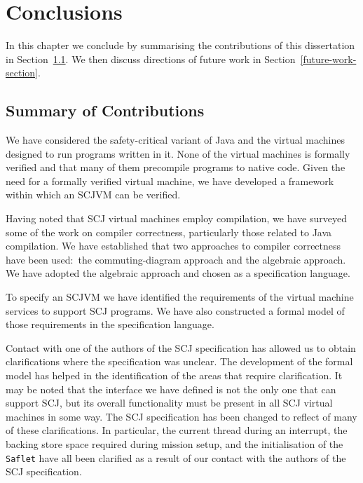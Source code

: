 \chapter{Conclusions}
\label{conclusions-chapter}
In this chapter we conclude by summarising the contributions of this
dissertation in Section~\ref{summary-section}.
We then discuss directions of future work in
Section~\ref{future-work-section}.

\section{Summary of Contributions}
\label{summary-section}

We have considered the safety-critical variant of Java and the virtual
machines designed to run programs written in it.
None of the virtual machines is formally verified and that many of
them precompile programs to native code.
Given the need for a formally verified virtual machine, we have
developed a framework within which an SCJVM can be verified.

Having noted that SCJ virtual machines employ compilation, we have
surveyed some of the work on compiler correctness, particularly those
related to Java compilation.
We have established that two approaches to compiler correctness have
been used:~the commuting-diagram approach and the algebraic approach.
We have adopted the algebraic approach and chosen \Circus{} as a
specification language.

To specify an SCJVM we have identified the requirements
of the virtual machine services to support SCJ programs.
We have also constructed a formal model of those requirements in the
\Circus{} specification language.

Contact with one of the authors of the SCJ specification has allowed
us to obtain clarifications where the specification was unclear.
The development of the formal model has helped in the identification
of the areas that require clarification.
It may be noted that the interface we have defined is not the only one
that can support SCJ, but its overall functionality must be present in
all SCJ virtual machines in some way.
The SCJ specification has been changed to reflect of many of these
clarifications.
In particular, the current thread during an interrupt, the backing
store space required during mission setup, and the initialisation of
the \texttt{Saflet} have all been clarified as a result of our contact
with the authors of the SCJ specification.

